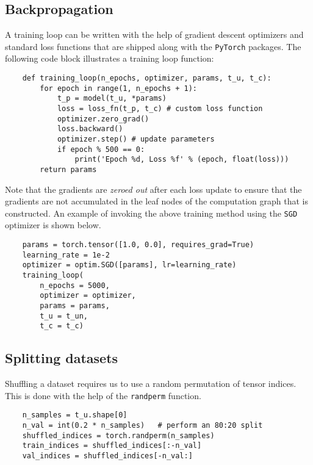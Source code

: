 \documentclass[11pt]{article}
\begin{document}
\subsection{Backpropagation}
\label{sec:org4b78d48}
A training loop can be written with the help of gradient descent optimizers and standard loss functions that are shipped along with the \texttt{PyTorch} packages. The following code block illustrates a training loop function:
\begin{verbatim}
    def training_loop(n_epochs, optimizer, params, t_u, t_c):
        for epoch in range(1, n_epochs + 1):
            t_p = model(t_u, *params)
            loss = loss_fn(t_p, t_c) # custom loss function
            optimizer.zero_grad()
            loss.backward()
            optimizer.step() # update parameters
            if epoch % 500 == 0:
                print('Epoch %d, Loss %f' % (epoch, float(loss)))
        return params
\end{verbatim}
Note that the gradients are \emph{zeroed out} after each loss update to ensure that the gradients are not accumulated in the leaf nodes of the computation graph that is constructed. An example of invoking the above training method using the \texttt{SGD} optimizer is shown below.
\begin{verbatim}
    params = torch.tensor([1.0, 0.0], requires_grad=True)
    learning_rate = 1e-2
    optimizer = optim.SGD([params], lr=learning_rate)
    training_loop(
        n_epochs = 5000,
        optimizer = optimizer,
        params = params,
        t_u = t_un,
        t_c = t_c)
\end{verbatim}

\subsection{Splitting datasets}
\label{sec:org6e5a991}
Shuffling a dataset requires us to use a random permutation of tensor indices. This is done with the help of the \texttt{randperm} function.
\begin{verbatim}
    n_samples = t_u.shape[0]
    n_val = int(0.2 * n_samples)   # perform an 80:20 split
    shuffled_indices = torch.randperm(n_samples)
    train_indices = shuffled_indices[:-n_val]
    val_indices = shuffled_indices[-n_val:]
\end{verbatim}
\end{document}
